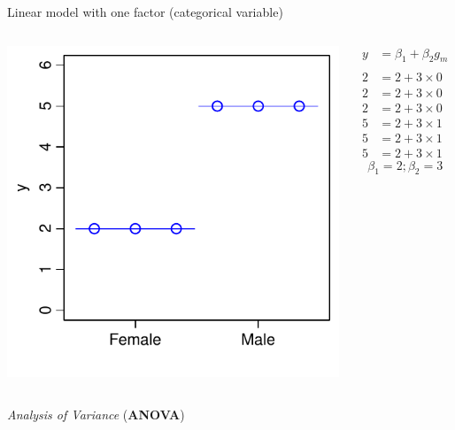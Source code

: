 \documentclass[xcolor=x11names,handout,compress]{beamer}
\renewcommand{\(}{\begin{columns}}
\renewcommand{\)}{\end{columns}}
\newcommand{\<}[1]{\begin{column}{#1}}
\renewcommand{\>}{\end{column}}
\begin{document}
\begin{frame}{Linear model with one factor (categorical variable)}

    \begin{columns}[T]
    
            \includegraphics[width=\textwidth]{Factor.pdf}
            
            \begin{align*}
              y  &= \beta_1 + \beta_2 g_m  \\
              \\
              2  &= 2 + 3 \times 0 \\
              2  &= 2 + 3 \times 0 \\
              2  &= 2 + 3 \times 0 \\
              5  &= 2 + 3 \times 1 \\  
              5  &= 2 + 3 \times 1 \\
              5  &= 2 + 3 \times 1
            \end{align*}
            \[\beta_1 = 2; \beta_2=3\]
    \end{columns}
    \pause
    \begin{center}
        {\it Analysis of Variance} ({\bf ANOVA})
    \end{center}

\end{frame}
    
\end{document}
